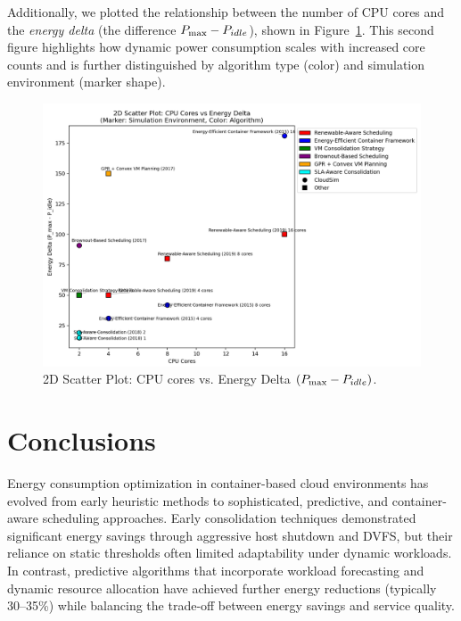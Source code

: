 \documentclass[runningheads]{llncs}
\begin{document}
Additionally, we plotted the relationship between the number of CPU cores and the \textit{energy delta} (the difference $P_{\max} - P_{\begin{footnotesize}idle \end{footnotesize}}$), shown in Figure~\ref{fig:energy_delta}. This second figure highlights how dynamic power consumption scales with increased core counts and is further distinguished by algorithm type (color) and simulation environment (marker shape).

\begin{figure}[H]
    \centering
    \includegraphics[width=0.8\columnwidth]{Energy.png}
    \caption{2D Scatter Plot: CPU cores vs. Energy Delta $(P_{\max} - P_{\begin{footnotesize}idle\end{footnotesize}})$.}
    \label{fig:energy_delta}
\end{figure}

\section{Conclusions}

Energy consumption optimization in container-based cloud environments has evolved from early heuristic methods to sophisticated, predictive, and container-aware scheduling approaches. Early consolidation techniques demonstrated significant energy savings through aggressive host shutdown and DVFS, but their reliance on static thresholds often limited adaptability under dynamic workloads\cite{carrega_energy-aware_2017}. In contrast, predictive algorithms that incorporate workload forecasting and dynamic resource allocation have achieved further energy reductions (typically 30--35\%) while balancing the trade-off between energy savings and service quality\cite{dabbagh_energy-efficient_2015,bui_energy_2017}.
\end{document}
